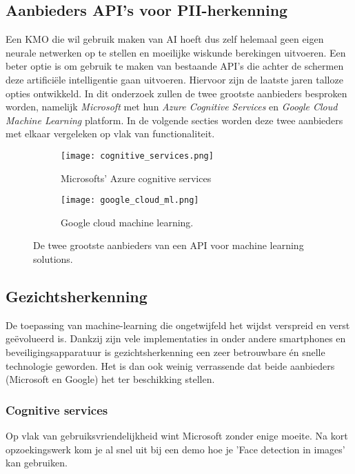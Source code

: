 \subsection{Aanbieders API's voor PII-herkenning}
Een KMO die wil gebruik maken van AI hoeft dus zelf helemaal geen eigen neurale netwerken op te stellen en moeilijke wiskunde berekingen uitvoeren. Een beter optie is om gebruik te maken van bestaande API's die achter de schermen deze artificiële intelligentie gaan uitvoeren. Hiervoor zijn de laatste jaren talloze opties ontwikkeld. In dit onderzoek zullen de twee grootste aanbieders besproken worden, namelijk \textit{Microsoft} met hun \textit{Azure Cognitive Services} en  \textit{Google Cloud Machine Learning} platform. In de volgende secties worden deze twee aanbieders met elkaar vergeleken op vlak van functionaliteit.
\begin{figure}[h]
    \centering
    \begin{subfigure}{0.5\textwidth}
        \centering
        \texttt{[image: cognitive\_services.png]}
        \caption{Microsofts' Azure cognitive services}
        \label{fig:sub1}
    \end{subfigure}%
    \begin{subfigure}{0.5\textwidth}
        \centering
        \texttt{[image: google\_cloud\_ml.png]}
        \caption{Google cloud machine learning.}
        \label{fig:sub2}
    \end{subfigure}
    \caption{De twee grootste aanbieders van een API voor machine learning solutions.}
    \label{fig:test}
\end{figure}

\subsection{Gezichtsherkenning}
De toepassing van machine-learning die ongetwijfeld het wijdst verspreid en verst geëvolueerd is. Dankzij zijn vele implementaties in onder andere smartphones en beveiligingsapparatuur is gezichtsherkenning een zeer betrouwbare én snelle technologie geworden. Het is dan ook weinig verrassende dat beide aanbieders (Microsoft en Google) het ter beschikking stellen. 

\subsubsection{Cognitive services}
Op vlak van gebruiksvriendelijkheid wint Microsoft zonder enige moeite. Na kort opzoekingswerk kom je al snel uit bij een demo hoe je 'Face detection in images' kan gebruiken. 


